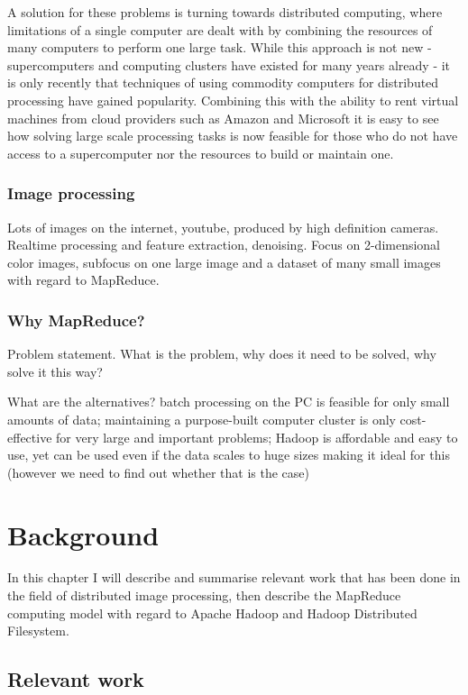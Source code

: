 \documentclass [12pt,a4paper]{report}
\begin{document}
A solution for these problems is turning towards distributed computing, where limitations of a single computer are dealt with by combining the resources of many computers to perform one large task. While this approach is not new - supercomputers and computing clusters have existed for many years already - it is only recently that techniques of using commodity computers for distributed processing have gained popularity. Combining this with the ability to rent virtual machines from cloud providers such as Amazon and Microsoft it is easy to see how solving large scale processing tasks is now feasible for those who do not have access to a supercomputer nor the resources to build or maintain one.

\subsection{Image processing}

Lots of images on the internet, youtube, produced by high definition cameras. Realtime processing and feature extraction, denoising. Focus on 2-dimensional color images, subfocus on one large image and a dataset of many small images with regard to MapReduce.

\subsection{Why MapReduce?}

Problem statement. What is the problem, why does it need to be solved, why solve it this way? 

What are the alternatives? batch processing on the PC is feasible for only small amounts of data; maintaining a purpose-built computer cluster is only cost-effective for very large and important problems; Hadoop is affordable and easy to use, yet can be used even if the data scales to huge sizes making it ideal for this (however we need to find out whether that is the case)


\chapter{Background}

In this chapter I will describe and summarise relevant work that has been done in the field of distributed image processing, then describe the MapReduce computing model with regard to Apache Hadoop and Hadoop Distributed Filesystem.

\section{Relevant work}
\end{document}
